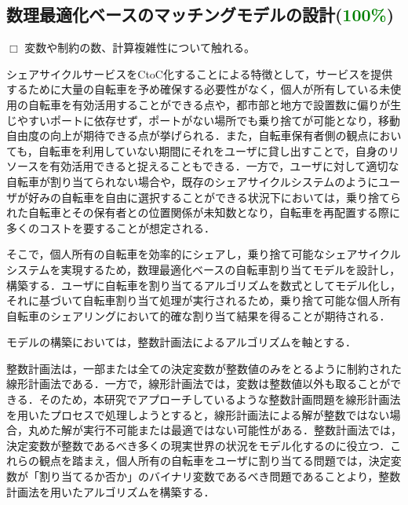   \subsection{数理最適化ベースのマッチングモデルの設計(\textcolor{green}{100\%})}
    \label{sec:数理最適化ベースのマッチングモデルの設計}
      \par $\Box$ 変数や制約の数、計算複雑性について触れる。
      \par シェアサイクルサービスをCtoC化することによる特徴として，サービスを提供するために大量の自転車を予め確保する必要性がなく，個人が所有している未使用の自転車を有効活用することができる点や，都市部と地方で設置数に偏りが生じやすいポートに依存せず，ポートがない場所でも乗り捨てが可能となり，移動自由度の向上が期待できる点が挙げられる．また，自転車保有者側の観点においても，自転車を利用していない期間にそれをユーザに貸し出すことで，自身のリソースを有効活用できると捉えることもできる．一方で，ユーザに対して適切な自転車が割り当てられない場合や，既存のシェアサイクルシステムのようにユーザが好みの自転車を自由に選択することができる状況下においては，乗り捨てられた自転車とその保有者との位置関係が未知数となり，自転車を再配置する際に多くのコストを要することが想定される．
          
      \par そこで，個人所有の自転車を効率的にシェアし，乗り捨て可能なシェアサイクルシステムを実現するため，数理最適化ベースの自転車割り当てモデルを設計し，構築する．ユーザに自転車を割り当てるアルゴリズムを数式としてモデル化し，それに基づいて自転車割り当て処理が実行されるため，乗り捨て可能な個人所有自転車のシェアリングにおいて的確な割り当て結果を得ることが期待される．
          
      \par モデルの構築においては，整数計画法によるアルゴリズムを軸とする．
          
      \par 整数計画法は，一部または全ての決定変数が整数値のみをとるように制約された線形計画法である．一方で，線形計画法では，変数は整数値以外も取ることができる．そのため，本研究でアプローチしているような整数計画問題を線形計画法を用いたプロセスで処理しようとすると，線形計画法による解が整数ではない場合，丸めた解が実行不可能または最適ではない可能性がある．整数計画法では，決定変数が整数であるべき多くの現実世界の状況をモデル化するのに役立つ．これらの観点を踏まえ，個人所有の自転車をユーザに割り当てる問題では，決定変数が「割り当てるか否か」のバイナリ変数であるべき問題であることより，整数計画法を用いたアルゴリズムを構築する．
          
